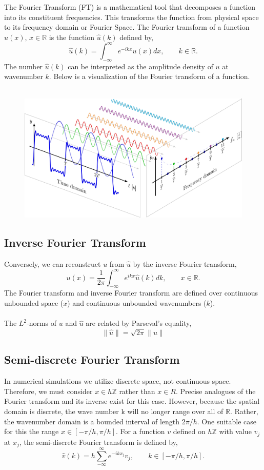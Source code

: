 \documentclass[12pt]{article}
\begin{document}
\begin{flushleft}
\qquad The Fourier Transform (FT) is a mathematical tool that decomposes a function into its constituent frequencies. This transforms the function from physical space to its frequency domain or Fourier Space. The Fourier transform of a function $u(x)$, $x\in \mathbb{R}$ is the function $\hat{u}(k)$ defined by,
$$\hat{u}(k) = \int_{-\infty}^{\infty}e^{-ikx}u(x)dx, \qquad k\in \mathbb{R}.$$
The number $\hat{u}(k)$ can be interpreted as the amplitude density of $u$ at wavenumber $k$. Below is a visualization of the Fourier transform of a function. 
\\~\\
\begin{figure}[h!]
\centering
\includegraphics[scale=0.08]{fourier_series_visualization.png}
\end{figure}

\subsection{Inverse Fourier Transform}
Conversely, we can reconstruct $u$ from $\hat{u}$ by the inverse Fourier transform,
$$u(x) = \frac{1}{2\pi}\int_{-\infty}^{\infty}e^{ikx}\hat{u}(k)dk, \qquad x\in\mathbb{R}.$$
The Fourier transform and inverse Fourier transform are defined over continuous unbounded space ($x$) and continuous unbounded wavenumbers ($k$). 
\\~\\
The $L^2$-norms of $u$ and $\hat{u}$ are related by Parseval's equality,
$$\|\hat{u}\| = \sqrt{2\pi}\|u\|$$

\subsection{Semi-discrete Fourier Transform}
\qquad In numerical simulations we utilize discrete space, not continuous space. Therefore, we must consider $x \in h\mathbb{Z}$ rather than $x\in R$. Precise analogues of the Fourier transform and its inverse exist for this case. However, because the spatial domain is discrete, the wave number k will no longer range over all of $\mathbb{R}$. Rather, the wavenumber domain is a bounded interval of length $2\pi/h$. One suitable case for this the range $x\in [-\pi/h,\pi/h]$. For a function $v$ defined on $h\mathbb{Z}$ with value $v_j$ at $x_j$, the semi-discrete Fourier transform is defined by,
$$\hat{v}(k) = h\sum_{-\infty}^{\infty}e^{-ikx_j}v_j, \qquad k\in [-\pi/h,\pi/h].$$


\end{flushleft}
\end{document}
